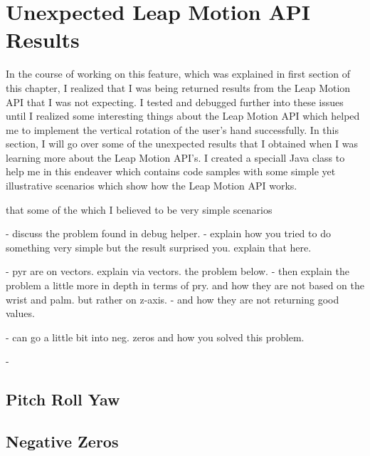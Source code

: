 \section{Unexpected Leap Motion API Results} 
In the course of working on this feature, which was explained in first section of this chapter, I realized that I was being returned results from the Leap Motion API that I was not expecting. I tested and debugged further into these issues until I realized some interesting things about the Leap Motion API which helped me to implement the vertical rotation of the user's hand successfully. In this section, I will go over some of the unexpected results that I obtained when I was learning more about the Leap Motion API's. I created a speciall Java class to help me in this endeaver which contains code samples with some simple yet illustrative scenarios which show how the Leap Motion API works. 






that some of the which I believed to be very simple scenarios  

- discuss the problem found in debug helper. 
- explain how you tried to do something very simple but the result surprised you. explain that here. 

- pyr are on vectors. explain via vectors. the problem below. 
- then explain the problem a little more in depth in terms of pry. and how they are not based on the wrist and palm. but rather on z-axis. 
- and how they are not returning good values. 

- can go a little bit into neg. zeros and how you solved this problem. 

- 
\subsection{Pitch Roll Yaw}


\subsection{Negative Zeros}




